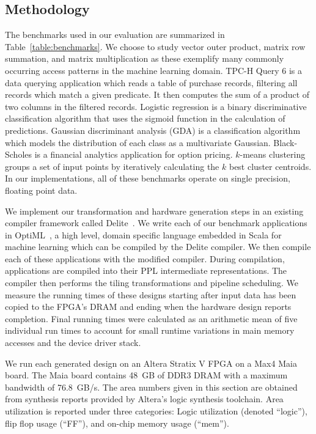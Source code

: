 \subsection{Methodology}
The benchmarks used in our evaluation are summarized in Table~\ref{table:benchmarks}.
We choose to study vector outer product, matrix row summation, and matrix multiplication as these exemplify many commonly occurring access patterns in the machine learning domain.
TPC-H Query 6 is a data querying application which reads a table of purchase records, filtering all
records which match a given predicate. It then computes the sum of a product of two columns in the filtered records.
Logistic regression is a binary discriminative classification algorithm that uses the sigmoid function in the calculation of predictions.
Gaussian discriminant analysis (GDA) is a classification algorithm which models the distribution of each class as a multivariate Gaussian.
Black-Scholes is a financial analytics application for option pricing.
$k$-means clustering groups a set of input points by iteratively calculating the $k$ best cluster centroids.
In our implementations, all of these benchmarks operate on single precision, floating point data.

We implement our transformation and hardware generation steps in an existing compiler framework called Delite~\cite{delite-tecs14}.
We write each of our benchmark applications in OptiML~\cite{optiml}, a high level, domain specific language embedded in Scala for machine learning which can be compiled by the Delite compiler.
We then compile each of these applications with the modified compiler.
During compilation, applications are compiled into their PPL intermediate representations.
The compiler then performs the tiling transformations and pipeline scheduling.
We measure the running times of these designs starting after input data has
been copied to the FPGA's DRAM and ending when the hardware design reports completion.
Final running times were calculated as an arithmetic mean of five individual run times to account for small runtime variations in main memory accesses and the device driver stack.

We run each generated design on an Altera Stratix V FPGA on a Max4 Maia board.
The Maia board contains 48~GB of DDR3 DRAM with a maximum bandwidth of 76.8~GB/s.
The area numbers given in this section are obtained from synthesis reports provided by Altera's logic synthesis toolchain.
Area utilization is reported under three categories: Logic utilization (denoted ``logic''), flip flop usage (``FF''), and on-chip memory usage (``mem'').

